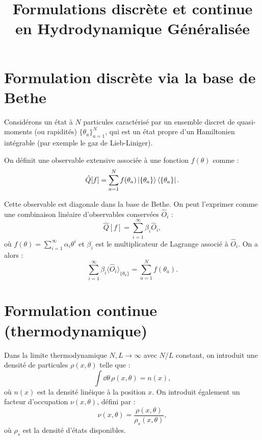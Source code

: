 \documentclass[11pt]{article}
\title{Formulations discrète et continue en Hydrodynamique Généralisée}
\author{}
\date{}
\begin{document}
\maketitle

\section{Formulation discrète via la base de Bethe}

Considérons un état à $N$ particules caractérisé par un ensemble discret de quasi-moments (ou rapidités) $\{ \theta_a \}_{a=1}^{N}$, qui est un état propre d’un Hamiltonien intégrable (par exemple le gaz de Lieb-Liniger).

On définit une observable extensive associée à une fonction $f(\theta)$ comme :
\begin{equation}
    \hat{Q}[f] = \sum_{a=1}^{N} f(\theta_a) \ket{\{\theta_a\}}\bra{\{\theta_a\}}.
\end{equation}

Cette observable est diagonale dans la base de Bethe. On peut l'exprimer comme une combinaison linéaire d'observables conservées $\hat{O}_i$ :
\begin{equation}
    \hat{Q}[f] = \sum_{i=1}^{\infty} \beta_i \hat{O}_i,
\end{equation}
où $f(\theta) = \sum_{i=1}^{\infty} \alpha_i \theta^i$ et $\beta_i$ est le multiplicateur de Lagrange associé à $\hat{O}_i$. On a alors :
\begin{equation}
    \sum_{i=1}^{\infty} \beta_i \langle \hat{O}_i \rangle_{\{\theta_a\}} = \sum_{a=1}^{N} f(\theta_a).
\end{equation}

\section{Formulation continue (thermodynamique)}

Dans la limite thermodynamique $N, L \to \infty$ avec $N/L$ constant, on introduit une densité de particules $\rho(x,\theta)$ telle que :
\begin{equation}
    \int \dd \theta \, \rho(x,\theta) = n(x),
\end{equation}
où $n(x)$ est la densité linéique à la position $x$. On introduit également un facteur d’occupation $\nu(x,\theta)$, défini par :
\begin{equation}
    \nu(x,\theta) = \frac{\rho(x,\theta)}{\rho_s(x,\theta)},
\end{equation}
où $\rho_s$ est la densité d'états disponibles.
\end{document}
